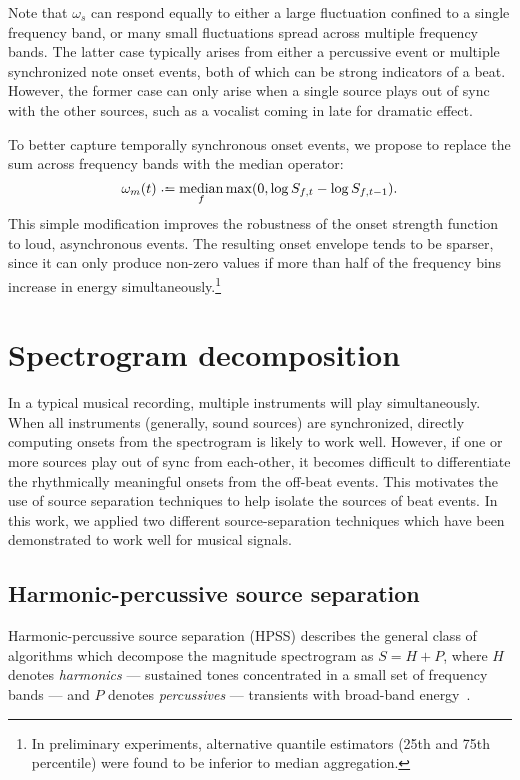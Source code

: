 \documentclass{article}
\begin{document}
Note that $\omega_s$ can respond equally to either a large fluctuation confined to a 
single frequency band, or many small fluctuations spread across multiple frequency bands.
The latter case typically arises from either a percussive event or multiple synchronized 
note onset events, both of which can be strong indicators of a beat.  However, the former 
case can only arise when a single source plays out of sync with the other sources, such 
as a vocalist coming in late for dramatic effect.

To better capture temporally synchronous onset events, we propose to replace the sum
across frequency bands with the median operator:
\begin{equation}
\omega_m(t) \defeq \median_f \max(0, \log S_{f, t} - \log S_{f, t-1}).\label{eq:onset:median}
\end{equation}
This simple modification improves the robustness of the onset strength function to loud, 
asynchronous events.  The resulting onset envelope tends to be sparser, since it can only 
produce non-zero values if more than half of the frequency bins increase in energy 
simultaneously.\footnote{In preliminary experiments, alternative quantile estimators 
(25th and 75th percentile) were found to be inferior to median aggregation.}

\section{Spectrogram decomposition}
\label{sec:spectrogram}

In a typical musical recording, multiple instruments will play simultaneously. When
all instruments (generally, sound sources) are synchronized, directly computing onsets
from the spectrogram is likely to work well.  
However, if one or more sources play out of sync from each-other, it becomes difficult
to differentiate the rhythmically meaningful onsets from the off-beat events.  This
motivates the use of source separation techniques to help isolate the sources of beat
events.  In this work, we applied two different source-separation techniques which have
been demonstrated to work well for musical signals.

\subsection{Harmonic-percussive source separation}
Harmonic-percussive source separation (HPSS) describes the general class of algorithms
which decompose the magnitude spectrogram as $S = H + P$, where $H$ denotes 
\emph{harmonics} --- sustained tones concentrated in a small set of frequency bands ---  
and $P$ denotes \emph{percussives} --- transients with broad-band 
energy~\cite{ono2008real}.  
\end{document}
